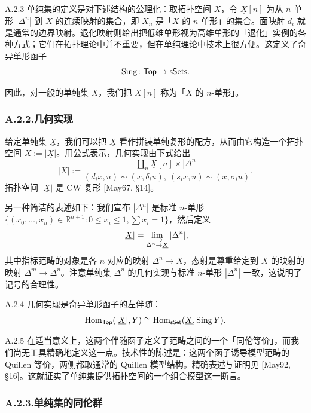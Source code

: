\begin{exam}{A.2.3}\label{thm:a6-06-14}
单纯集的定义是对下述结构的公理化：取拓扑空间 $X$，令 $\underline X[n]$ 为从 $n$-单形 $|\Delta^n|$ 到 $X$ 的连续映射的集合，即 $X_n$ 是「$X$ 的 $n$-单形」的集合。面映射 $d_i$ 就是通常的边界映射。退化映射则给出把低维单形视为高维单形的「退化」实例的各种方式；它们在拓扑理论中并不重要，但在单纯理论中技术上很方便。这定义了奇异单形函子
\[
\operatorname{Sing}\colon\mathsf{Top}\to\mathsf{sSets}.
\]
\end{exam}

因此，对一般的单纯集 $\underline X$，我们把 $\underline X[n]$ 称为「$\underline X$ 的 $n$-单形」。

\subsubsection*{A.2.2.\quad 几何实现}

给定单纯集 $\underline X$，我们可以把 $\underline X$ 看作拼装单纯复形的配方，从而由它构造一个拓扑空间 $X:=|\underline X|$。用公式表示，几何实现由下式给出
\[
|\underline X|:=\frac{\coprod_n\underline X[n]\times|\Delta^n|}{(d_ix,u)\sim(x,\delta_iu),\ (s_ix,u)\sim(x,\sigma_iu)}.
\]
拓扑空间 $|\underline X|$ 是 CW 复形 [May67, §14]。

另一种简洁的表述如下：我们宣布 $|\Delta^n|$ 是标准 $n$-单形 $\{(x_0,\dots,x_n)\in\mathbb R^{n+1}\colon0\le x_i\le1,\sum x_i=1\}$，然后定义
\[
|\underline X|=\varinjlim_{\Delta^n\to\underline X}|\Delta^n|,
\]
其中指标范畴的对象是各 $n$ 对应的映射 $\Delta^n\to\underline X$，态射是尊重给定到 $\underline X$ 的映射的映射 $\Delta^m\to\Delta^n$。注意单纯集 $\Delta^n$ 的几何实现与标准 $n$-单形 $|\Delta^n|$ 一致，这说明了记号的合理性。

\begin{prop}{A.2.4}\label{thm:a6-06-15}
几何实现是奇异单形函子的左伴随：
\[
\operatorname{Hom}_{\mathsf{Top}}(|\underline X|,Y)\cong\operatorname{Hom}_{\mathsf{sSet}}(\underline X,\operatorname{Sing} Y).
\]
\end{prop}

\begin{rem}{A.2.5}\label{thm:a6-06-16}
在适当意义上，这两个伴随函子定义了范畴之间的一个「同伦等价」，而我们尚无工具精确地定义这一点。技术性的陈述是：这两个函子诱导模型范畴的 Quillen 等价，两侧都取通常的 Quillen 模型结构。精确表述与证明见 [May92, §16]。这就证实了单纯集提供拓扑空间的一个组合模型这一断言。
\end{rem}

\subsubsection*{A.2.3.\quad 单纯集的同伦群}

